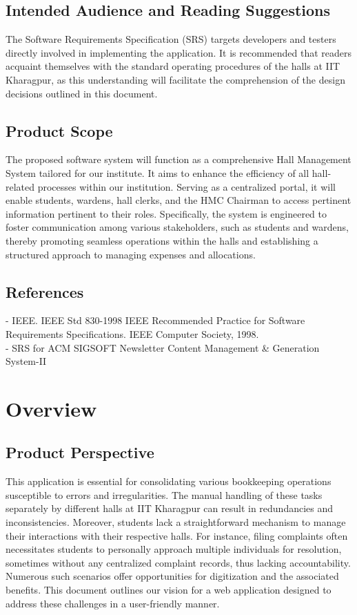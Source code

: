 \documentclass{scrreprt}
\begin{document}
\section{Intended Audience and Reading Suggestions}
The Software Requirements Specification (SRS) targets developers and testers directly involved in implementing the application. It is recommended that readers acquaint themselves with the standard operating procedures of the halls at IIT Kharagpur, as this understanding will facilitate the comprehension of the design decisions outlined in this document.

\section{Product Scope}
The proposed software system will function as a comprehensive Hall Management System tailored for our institute. It aims to enhance the efficiency of all hall-related processes within our institution. Serving as a centralized portal, it will enable students, wardens, hall clerks, and the HMC Chairman to access pertinent information pertinent to their roles. Specifically, the system is engineered to foster communication among various stakeholders, such as students and wardens, thereby promoting seamless operations within the halls and establishing a structured approach to managing expenses and allocations.


\section{References}
- IEEE. IEEE Std 830-1998 IEEE Recommended Practice for Software Requirements Specifications. IEEE
Computer Society, 1998.
\\- SRS for ACM SIGSOFT Newsletter Content Management \& Generation System-II

\chapter{Overview}

\section{Product Perspective}
This application is essential for consolidating various bookkeeping operations susceptible to errors and irregularities. The manual handling of these tasks separately by different halls at IIT Kharagpur can result in redundancies and inconsistencies. Moreover, students lack a straightforward mechanism to manage their interactions with their respective halls. For instance, filing complaints often necessitates students to personally approach multiple individuals for resolution, sometimes without any centralized complaint records, thus lacking accountability. Numerous such scenarios offer opportunities for digitization and the associated benefits. This document outlines our vision for a web application designed to address these challenges in a user-friendly manner.
\end{document}
